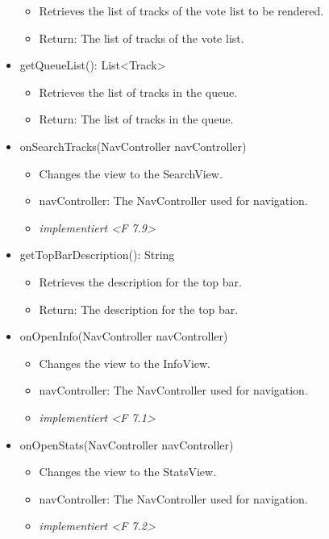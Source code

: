 \documentclass[oneside, ngerman]{sdqtechreport}
\begin{document}
\begin{itemize}
        \begin{itemize}
            \item Retrieves the list of tracks of the vote list to be rendered.
            \item Return: The list of tracks of the vote list.
        \end{itemize}
    \item getQueueList(): List<Track>
        \begin{itemize}
            \item Retrieves the list of tracks in the queue.
            \item Return: The list of tracks in the queue.
        \end{itemize}
    \item onSearchTracks(NavController navController)
        \begin{itemize}
            \item Changes the view to the SearchView.
            \item navController: The NavController used for navigation.
            \item \textit{implementiert <F 7.9>}
        \end{itemize}
    \item getTopBarDescription(): String
        \begin{itemize}
            \item Retrieves the description for the top bar.
            \item Return: The description for the top bar.
        \end{itemize}
    \item onOpenInfo(NavController navController)
        \begin{itemize}
            \item Changes the view to the InfoView.
            \item navController: The NavController used for navigation.
            \item \textit{implementiert <F 7.1>}
        \end{itemize}
    \item onOpenStats(NavController navController)
        \begin{itemize}
            \item Changes the view to the StatsView.
            \item navController: The NavController used for navigation.
            \item \textit{implementiert <F 7.2>}

\end{itemize}
\end{itemize}
\end{document}
